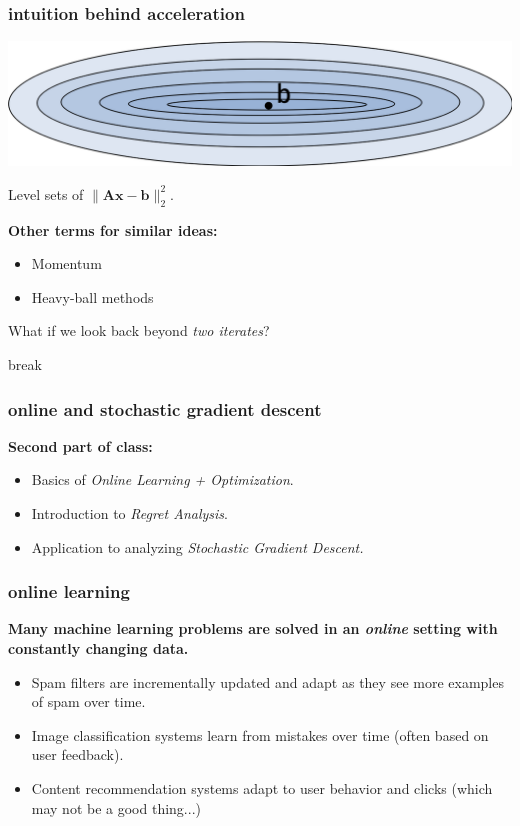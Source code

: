 \documentclass[compress]{beamer}
\newcommand{\bv}[1]{\mathbf{#1}}
\begin{document}
\begin{frame}[t]
	\frametitle{intuition behind acceleration}
	\begin{center}
		\includegraphics[width=\textwidth]{poor_conditioning.png}
		
		Level sets of $\|\bv{A}\bv{x} - \bv{b}\|_2^2$.
	\end{center}
	
	\textbf{Other terms for similar ideas:}
	\begin{itemize}
		\item Momentum
		\item Heavy-ball methods
	\end{itemize}
	
	\begin{center}
		\alert{What if we look back beyond \emph{two iterates}?}
	\end{center}
\end{frame}


\begin{frame}[standout]
	\begin{center}
		break
	\end{center}
\end{frame}


\begin{frame}[t]
	\frametitle{online and stochastic gradient descent}
	\textbf{Second part of class:}
	\begin{itemize}
		\item Basics of \emph{Online Learning + Optimization}. 
		\item Introduction to \emph{Regret Analysis}.
		\item Application to analyzing \emph{Stochastic Gradient Descent.}
	\end{itemize}
	
\end{frame}


\begin{frame}
	\frametitle{online learning}
	\begin{center}
		\textbf{Many machine learning problems are solved in an \emph{online} setting with constantly changing data.}
	\end{center}
	\begin{itemize}
		\item Spam filters are incrementally updated and adapt as they see more examples of spam over time. 
		\item Image classification systems learn from mistakes over time (often based on user feedback). 
		\item Content recommendation systems adapt to user behavior and clicks (which may not be a good thing...)
	\end{itemize}
\end{frame}
\end{document}
